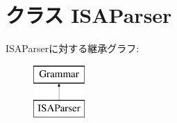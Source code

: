 \hypertarget{classisa__parser_1_1ISAParser}{
\section{クラス ISAParser}
\label{classisa__parser_1_1ISAParser}
}
ISAParserに対する継承グラフ:\begin{figure}[H]
\begin{center}
\leavevmode
\includegraphics[height=2cm]{classisa__parser_1_1ISAParser}
\end{center}
\end{figure}
